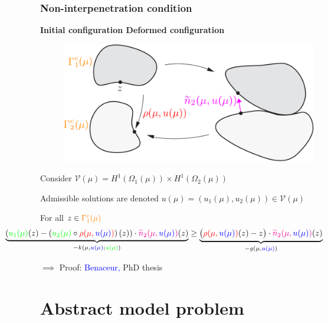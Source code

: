 \documentclass[a4paper,10pt]{beamer}
\newcommand\gr[1]{\textcolor{green} {#1} }
\newcommand\red[1]{\textcolor{red} {#1} }
\newcommand\bl[1]{\textcolor{blue} {#1} }
\newcommand\magenta[1]{\textcolor{magenta} {#1} }
\newcommand\ora[1]{\textcolor{orange}{#1}}
\begin{document}
\begin{frame}\frametitle{Non-interpenetration condition}
\addtocounter{framenumber}{-1}
\vspace{-.3cm}
\begin{center}
 {\bfseries \hspace{.7cm} Initial configuration \hspace{1.cm} Deformed configuration}
\end{center}
\vspace{-.2cm}\begin{figure}
\qquad
 \includegraphics[width=.7\textwidth]{./images/contact/scheme.png}
 \centering
\end{figure}
\vspace{0.1cm}

Consider $\mathcal V(\mu)=H^1(\Omega_1(\mu)) \times H^1(\Omega_2(\mu))$

Admissible solutions are denoted $u(\mu)=(u_1(\mu),u_2(\mu))\in\mathcal V(\mu)$

\hspace{-1.7cm}
\begin{minipage}{1.2\textwidth}
\small{
For all $z \in \ora{\Gamma^c_1(\mu)}$
\vspace{-0.3cm}
$$
\hspace{-2.1cm}\underbrace{\left(\gr{u_1(\mu)}(z)- \left(\gr{u_2(\mu)}\circ\red{\rho(\mu,\bl{u(\mu)})}\right)(z)\right)\cdot 
\magenta{\widetilde n_2(\mu,\bl{u(\mu)})}(z)}_{-k(\mu,\bl{u(\mu)};\gr{u(\mu)})}
\geq
\underbrace{\big(\red{\rho(\mu,\bl{u(\mu)})}(z)-z\big)\cdot \magenta{\widetilde n_2(\mu,\bl{u(\mu)})}(z)}_{-g(\mu,\bl{u(\mu)})}
$$
}
\vspace{-0.3cm}

{\small $\implies$ Proof: \bl{Benaceur,}PhD thesis}
\end{minipage}
\end{frame}

\section{Abstract model problem}
\end{document}
